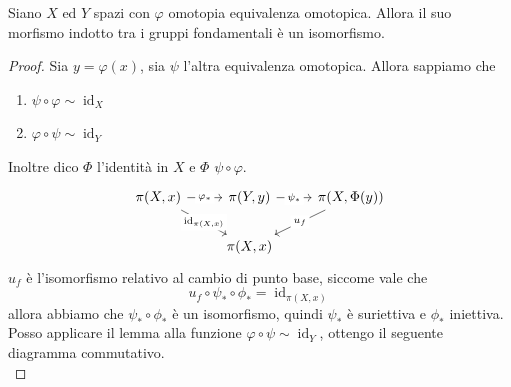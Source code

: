 \begin{corollary} Siano $X$ ed $Y$ spazi con $\varphi$ omotopia equivalenza omotopica. Allora il suo morfismo indotto tra i gruppi fondamentali è un isomorfismo.
\end{corollary}
\begin{proof} Sia $y=\varphi(x)$, sia $\psi$ l'altra equivalenza omotopica. Allora sappiamo che 
	\begin{enumerate}
		\item 	$\psi \circ \varphi \sim \operatorname{id}_X$
		\item	$\varphi \circ \psi \sim \operatorname{id}_Y$ 
	\end{enumerate}
Inoltre dico $\Phi$ l'identità in $X$ e $\Phi$ $\psi \circ \varphi$.
	\begin{equation*}
	\begin{tikzcd}
	{\pi(X,x)} \arrow[rd, "{\operatorname{id}_{\pi(X,x)}}" description] \arrow[r, "\varphi_*" description] & {\pi(Y,y)} \arrow[r, "\psi_*" description] & {\pi(X,\Phi(y))} \arrow[ld, "u_f" description] \\
	& {\pi(X,x)}                                 &                                               
	\end{tikzcd}
	\end{equation*}
	$u_f$ è l'isomorfismo relativo al cambio di punto base, siccome vale che 
	\begin{equation*}
	u_f \circ \psi_* \circ \phi_* = \operatorname{id}_{\pi(X,x)}
	\end{equation*}
	allora abbiamo che $\psi_* \circ \phi_*$ è un isomorfismo, quindi $\psi_*$ è suriettiva e $\phi_*$ iniettiva. Posso applicare il lemma alla funzione $\varphi \circ \psi \sim \operatorname{id}_Y$, ottengo il seguente diagramma commutativo.
	\begin{equation*}

\end{equation*}
\end{proof}
